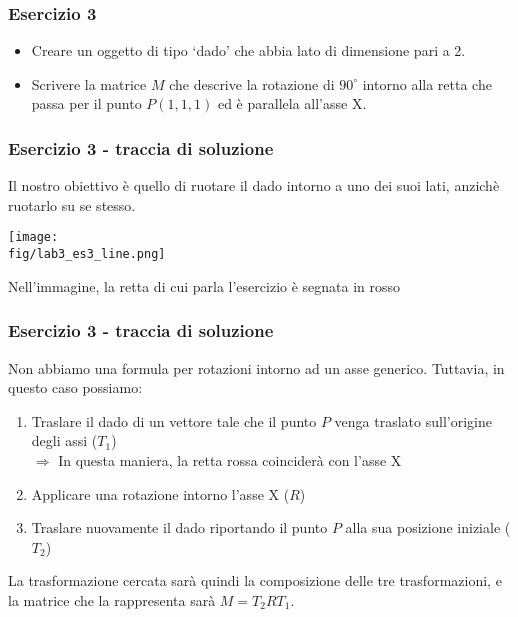 \documentclass{beamer}
\newcommand{\fig}{figures} %
\begin{document}
\begin{frame}
\frametitle{Esercizio 3}
\begin{itemize}
    \item Creare un oggetto di tipo `dado' che abbia lato di dimensione pari a 2.
    \item Scrivere la matrice $M$ che descrive la rotazione di $90^\circ$ intorno alla retta 
        che passa per il punto $P(1, 1, 1)$ ed \`e parallela all'asse X.
\end{itemize}
\end{frame}

\begin{frame}
\frametitle{Esercizio 3 - traccia di soluzione}
Il nostro obiettivo \`e quello di ruotare il dado intorno a uno dei suoi lati, anzich\`e ruotarlo
su se stesso.

    \vspace{0.5cm}

    \centering
    \texttt{[image: \\fig/lab3\_es3\_line.png]}

Nell'immagine, la retta di cui parla l'esercizio \`e segnata in rosso

\end{frame}

\begin{frame}
\frametitle{Esercizio 3 - traccia di soluzione}
Non abbiamo una formula per rotazioni intorno ad un asse generico. Tuttavia,
in questo caso possiamo:
    \begin{enumerate}
        \item Traslare il dado di un vettore tale che il punto $P$ venga traslato sull'origine degli assi ($T_1$) \\
            $\Rightarrow$ In questa maniera, la retta rossa coincider\`a con l'asse X
        \item Applicare una rotazione intorno l'asse X ($R$)
        \item Traslare nuovamente il dado riportando il punto $P$ alla sua posizione iniziale ($T_2$)
    \end{enumerate}

    La trasformazione cercata sar\`a quindi la composizione delle tre trasformazioni, e la
    matrice che la rappresenta sar\`a $M= T_2 R T_1$.
\end{frame}
\end{document}
